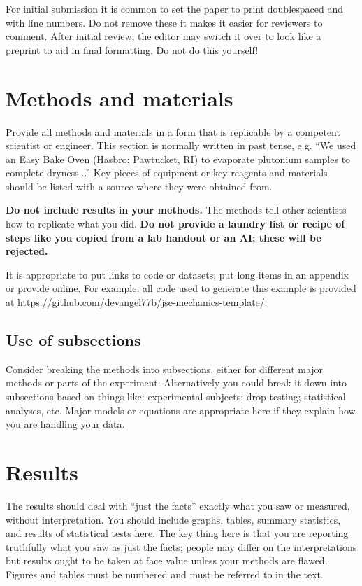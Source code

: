 \documentclass[amsmath,amssymb,aps,endfloats,linenumbers]{revtex4-2}
\begin{document}
For initial submission it is common to set the paper to print doublespaced and with line numbers. Do not remove these it makes it easier for reviewers to comment. After initial review, the editor may switch it over to look like a preprint to aid in final formatting. Do not do this yourself! 






\section{Methods and materials}
Provide all methods and materials in a form that is replicable by a competent scientist or engineer. This section is normally written in past tense, e.g. ``We used an Easy Bake Oven (Hasbro; Pawtucket, RI) to evaporate plutonium samples to complete dryness...'' Key pieces of equipment or key reagents and materials should be listed with a source where they were obtained from. 

\textbf{Do not include results in your methods.} The methods tell other scientists how to replicate what you did. \textbf{Do not provide a laundry list or recipe of steps like you copied from a lab handout or an AI; these will be rejected.} 

It is appropriate to put links to code or datasets; put long items in an appendix or provide online.  For example, all code used to generate this example is provided at \url{https://github.com/devangel77b/jse-mechanics-template/}. 


\subsection{Use of subsections}
Consider breaking the methods into subsections, either for different major methods or parts of the experiment. Alternatively you could break it down into subsections based on things like: experimental subjects; drop testing; statistical analyses, etc. Major models or equations are appropriate here if they explain how you are handling your data. 





        
\section{Results}
The results should deal with ``just the facts'' exactly what you saw or measured, without interpretation. You should include graphs, tables, summary statistics, and results of statistical tests here. The key thing here is that you are reporting truthfully what you saw as just the facts; people may differ on the interpretations but results ought to be taken at face value unless your methods are flawed. Figures and tables must be numbered and must be referred to in the text. 
\end{document}
